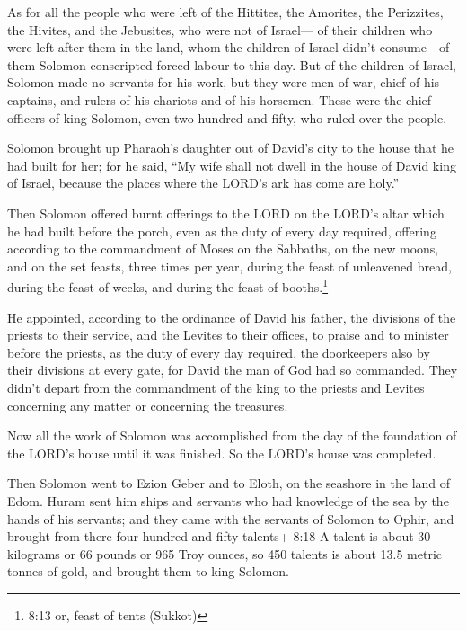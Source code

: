  As for all the people who were left of the Hittites, the
Amorites, the Perizzites, the Hivites, and the Jebusites, who were not
of Israel---  of their children who were left after them in
the land, whom the children of Israel didn't consume---of them Solomon
conscripted forced labour to this day.  But of the children
of Israel, Solomon made no servants for his work, but they were men of
war, chief of his captains, and rulers of his chariots and of his
horsemen.  These were the chief officers of king Solomon,
even two-hundred and fifty, who ruled over the people.

 Solomon brought up Pharaoh's daughter out of David's city
to the house that he had built for her; for he said, ``My wife shall not
dwell in the house of David king of Israel, because the places where the
LORD's ark has come are holy.''

 Then Solomon offered burnt offerings to the LORD on the
LORD's altar which he had built before the porch,  even as
the duty of every day required, offering according to the commandment of
Moses on the Sabbaths, on the new moons, and on the set feasts, three
times per year, during the feast of unleavened bread, during the feast
of weeks, and during the feast of booths.\footnote{8:13 or, feast of
  tents (Sukkot)}

 He appointed, according to the ordinance of David his
father, the divisions of the priests to their service, and the Levites
to their offices, to praise and to minister before the priests, as the
duty of every day required, the doorkeepers also by their divisions at
every gate, for David the man of God had so commanded. 
They didn't depart from the commandment of the king to the priests and
Levites concerning any matter or concerning the treasures.

 Now all the work of Solomon was accomplished from the day
of the foundation of the LORD's house until it was finished. So the
LORD's house was completed.

 Then Solomon went to Ezion Geber and to Eloth, on the
seashore in the land of Edom.  Huram sent him ships and
servants who had knowledge of the sea by the hands of his servants; and
they came with the servants of Solomon to Ophir, and brought from there
four hundred and fifty talents+ 8:18 A talent is about 30 kilograms or
66 pounds or 965 Troy ounces, so 450 talents is about 13.5 metric tonnes
of gold, and brought them to king Solomon.


